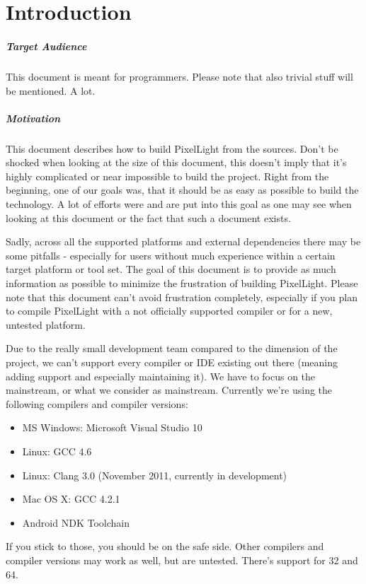 \chapter{Introduction}


\paragraph{Target Audience}
This document is meant for programmers. Please note that also trivial stuff will be mentioned. A lot.


\paragraph{Motivation}
This document describes how to build PixelLight from the sources. Don't be shocked when looking at the size of this document, this doesn't imply that it's highly complicated or near impossible to build the project. Right from the beginning, one of our goals was, that it should be as easy as possible to build the technology. A lot of efforts were and are put into this goal as one may see when looking at this document or the fact that such a document exists.

Sadly, across all the supported platforms and external dependencies there may be some pitfalls - especially for users without much experience within a certain target platform or tool set. The goal of this document is to provide as much information as possible to minimize the frustration of building PixelLight. Please note that this document can't avoid frustration completely, especially if you plan to compile PixelLight with a not officially supported compiler or for a new, untested platform.

Due to the really small development team compared to the dimension of the project, we can't support every compiler or \ac{IDE} existing out there (meaning adding support and especially maintaining it). We have to focus on the mainstream, or what we consider as mainstream. Currently we're using the following compilers and compiler versions:
\begin{itemize}
\item{\ac{MS} Windows: Microsoft Visual Studio 10}
\item{Linux: \ac{GCC} 4.6}
\item{Linux: Clang 3.0 (November 2011, currently in development)}
\item{Mac OS X: \ac{GCC} 4.2.1}
\item{Android \ac{NDK} Toolchain}
\end{itemize}
If you stick to those, you should be on the safe side. Other compilers and compiler versions may work as well, but are untested. There's support for \SI{32}{\bit} and \SI{64}{\bit}.


